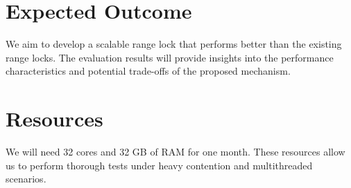 \section{Expected Outcome}
We aim to develop a scalable range lock that performs better than the existing range locks. The evaluation results will provide insights into the performance characteristics and potential trade-offs of the proposed mechanism.

\section{Resources}
We will need 32 cores and 32 GB of RAM for one month. These resources allow us to perform thorough tests under heavy contention and multithreaded scenarios.